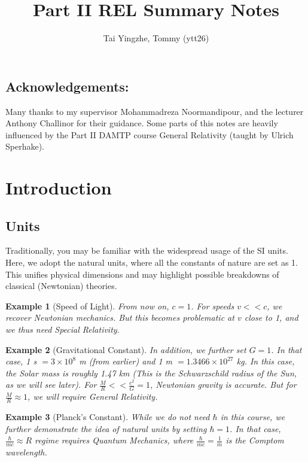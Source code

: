 \documentclass[a4paper]{article}
\title{\textbf{Part II REL Summary Notes}}
\author{Tai Yingzhe, Tommy (ytt26)}
\date{}
\newtheorem{eg}{Example}[section]
\theoremstyle{new}
\begin{document}
\maketitle
\tableofcontents
\subsection*{Acknowledgements:}
Many thanks to my supervisor Mohammadreza Noormandipour, and the lecturer Anthony Challinor for their guidance. Some parts of this notes are heavily influenced by the Part II DAMTP course General Relativity (taught by Ulrich Sperhake).
\newpage
\section{Introduction}
\subsection{Units}
Traditionally, you may be familiar with the widespread usage of the SI units. Here, we adopt the natural units, where all the constants of nature are set as 1. This unifies physical dimensions and may highlight possible breakdowns of classical (Newtonian) theories. 
\begin{eg}[Speed of Light]
From now on, $c=1$. For speeds $v<<c$, we recover Newtonian mechanics. But this becomes problematic at $v$ close to 1, and we thus need Special Relativity.
\end{eg}
\begin{eg}[Gravitational Constant]
In addition, we further set $G=1$. In that case, 1 s $=3\times10^8$ m (from earlier) and 1 m $=1.3466\times10^{27}$ kg. In this case, the Solar mass is roughly 1.47 km (This is the Schwarzschild radius of the Sun, as we will see later). For $\frac{M}{R}<<\frac{c^2}{G}=1$, Newtonian gravity is accurate. But for $\frac{M}{R}\approx 1$, we will require General Relativity.
\end{eg}
\begin{eg}[Planck's Constant]
While we do not need $\hbar$ in this course, we further demonstrate the idea of natural units by setting $\hbar=1$. In that case, $\frac{\hbar}{mc}\approx R$ regime requires Quantum Mechanics, where $\frac{\hbar}{mc}=\frac{1}{m}$ is the Comptom wavelength.
\end{eg}
\end{document}
